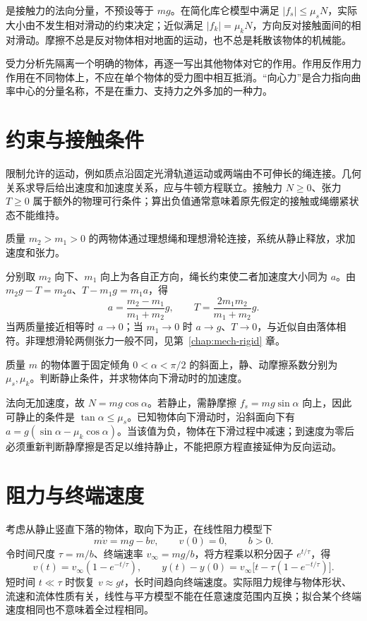 \documentclass[UTF8,12pt,a4paper,fontset=fandol]{ctexbook}
\begin{document}
是接触力的法向分量，不预设等于 $mg$。在简化库仑模型中满足 $|f_s|\le\mu_s N$，实际大小由不发生相对滑动的约束决定；近似满足 $|f_k|=\mu_kN$，方向反对接触面间的相对滑动。摩擦不总是反对物体相对地面的运动，也不总是耗散该物体的机械能。

受力分析先隔离一个明确的物体，再逐一写出其他物体对它的作用。作用反作用力作用在不同物体上，不应在单个物体的受力图中相互抵消。“向心力”是合力指向曲率中心的分量名称，不是在重力、支持力之外多加的一种力。

\section{约束与接触条件}
限制允许的运动，例如质点沿固定光滑轨道运动或两端由不可伸长的绳连接。几何关系求导后给出速度和加速度关系，应与牛顿方程联立。接触力 $N\ge0$、张力 $T\ge0$ 属于额外的物理可行条件；算出负值通常意味着原先假定的接触或绳绷紧状态不能维持。

\begin{example}[阿特伍德装置]
质量 $m_2>m_1>0$ 的两物体通过理想绳和理想滑轮连接，系统从静止释放，求加速度和张力。
\end{example}
\begin{solve}
分别取 $m_2$ 向下、$m_1$ 向上为各自正方向，绳长约束使二者加速度大小同为 $a$。由 $m_2g-T=m_2a$、$T-m_1g=m_1a$，得
\[
 a=\frac{m_2-m_1}{m_1+m_2}g,\qquad T=\frac{2m_1m_2}{m_1+m_2}g.
\]
当两质量接近相等时 $a\to0$；当 $m_1\to0$ 时 $a\to g$、$T\to0$，与近似自由落体相符。非理想滑轮两侧张力一般不同，见第~\ref{chap:mech-rigid} 章。
\end{solve}

\begin{example}[斜面上的摩擦状态]
质量 $m$ 的物体置于固定倾角 $0<\alpha<\pi/2$ 的斜面上，静、动摩擦系数分别为 $\mu_s,\mu_k$。判断静止条件，并求物体向下滑动时的加速度。
\end{example}
\begin{solve}
法向无加速度，故 $N=mg\cos\alpha$。若静止，需静摩擦 $f_s=mg\sin\alpha$ 向上，因此可静止的条件是 $\tan\alpha\le\mu_s$。已知物体向下滑动时，沿斜面向下有 $a=g(\sin\alpha-\mu_k\cos\alpha)$。当该值为负，物体在下滑过程中减速；到速度为零后必须重新判断静摩擦是否足以维持静止，不能把原方程直接延伸为反向运动。
\end{solve}

\section{阻力与终端速度}
考虑从静止竖直下落的物体，取向下为正，在线性阻力模型下
\[
 m\dot v=mg-bv,\qquad v(0)=0,\qquad b>0.
\]
令时间尺度 $\tau=m/b$、终端速率 $v_\infty=mg/b$，将方程乘以积分因子 $e^{t/\tau}$，得
\begin{equation}
 v(t)=v_\infty(1-e^{-t/\tau}),\qquad
 y(t)-y(0)=v_\infty\bigl[t-\tau(1-e^{-t/\tau})\bigr].
 \label{eq:mech-drag}
\end{equation}
短时间 $t\ll\tau$ 时恢复 $v\approx gt$，长时间趋向终端速度。实际阻力规律与物体形状、流速和流体性质有关，线性与平方模型不能在任意速度范围内互换；拟合某个终端速度相同也不意味着全过程相同。
\end{document}
